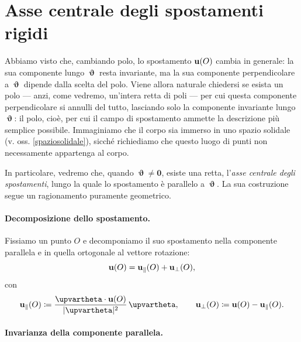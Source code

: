\section{Asse centrale degli spostamenti rigidi}\label{assecentraleSP}
Abbiamo visto che, cambiando polo, lo spostamento $\mathbf{u}(O)$ cambia in generale: la sua componente lungo $\bm{\upvartheta}$ resta invariante, ma la sua componente perpendicolare a $\bm{\upvartheta}$ dipende dalla scelta del polo. Viene allora naturale chiedersi se esista un polo — anzi, come vedremo, un'intera retta di poli — per cui questa componente perpendicolare si annulli del tutto, lasciando solo la componente invariante lungo $\bm{\upvartheta}$: il polo, cioè, per cui il campo di spostamento ammette la descrizione più semplice possibile.  Immaginiamo che il corpo sia immerso in uno spazio solidale (v.  oss. \ref{spaziosolidale}), sicché richiediamo che questo luogo di punti non necessamente appartenga al corpo.
 
In particolare, vedremo che, quando $\bm{\upvartheta} \neq \mathbf 0$, esiste una retta,
l'\textit{asse centrale degli spostamenti}, lungo la quale lo
spostamento è parallelo a $\bm{\upvartheta}$. La sua
costruzione segue un ragionamento puramente geometrico.

\paragraph{Decomposizione dello spostamento.}

Fissiamo un punto $O$ e decomponiamo il suo spostamento nella
componente parallela e in quella ortogonale al vettore
rotazione:
\begin{equation}\label{eq:decomp_spostamento}
	\mathbf{u}(O) = \mathbf{u}_{\parallel}(O) + \mathbf{u}_{\perp}(O),
\end{equation}
con
\begin{equation}
	\ub_{\parallel}(O)
	\coloneqq \frac{\bm{\upvartheta} \cdot \ub(O)}%
	{|\bm{\upvartheta}|^2}\,\bm{\upvartheta}, \qquad
	\ub_{\perp}(O)
	\coloneqq \ub(O) - \ub_{\parallel}(O).
\end{equation}

\paragraph{Invarianza della componente parallela.}

